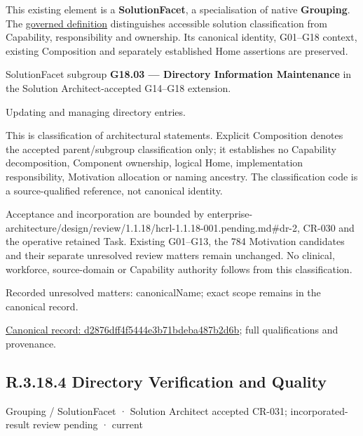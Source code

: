 This existing element is a \textbf{SolutionFacet}, a specialisation of native
\textbf{Grouping}. The \href{\detokenize{../../../../../../../governance/continuum-representation.md#solutionfacet-classification--1119-candidate}}{governed definition}
distinguishes accessible solution classification from Capability, responsibility
and ownership. Its canonical identity, G01–G18 context, existing Composition
and separately established Home assertions are preserved.



SolutionFacet subgroup \textbf{G18.03 — Directory Information Maintenance} in the Solution Architect-accepted G14–G18 extension.



Updating and managing directory entries.



This is classification of architectural statements. Explicit Composition denotes the accepted parent/subgroup classification only; it establishes no Capability decomposition, Component ownership, logical Home, implementation responsibility, Motivation allocation or naming ancestry. The classification code is a source-qualified reference, not canonical identity.



Acceptance and incorporation are bounded by enterprise-architecture/design/review/1.1.18/hcrl-1.1.18-001.pending.md\#dr-2, CR-030 and the operative retained Task. Existing G01–G13, the 784 Motivation candidates and their separate unresolved review matters remain unchanged. No clinical, workforce, source-domain or Capability authority follows from this classification.


{\small Recorded unresolved matters: canonicalName; exact scope remains in the canonical record.}\par
{\footnotesize \href{../../../../../../../continuum/grouping/d2876dff4f5444e3b71bdeba487b2d6b.md}{Canonical record: d2876dff4f5444e3b71bdeba487b2d6b}; full qualifications and provenance.}\par
\subsection*{R.3.18.4 Directory Verification and Quality}
\label{navigation:R.3.18.4}

\label{element:7b2cabb4089d414d8ad700ef5f7932b7}
{\small Grouping / SolutionFacet · Solution Architect accepted CR-031; incorporated-result review pending · current}\par

